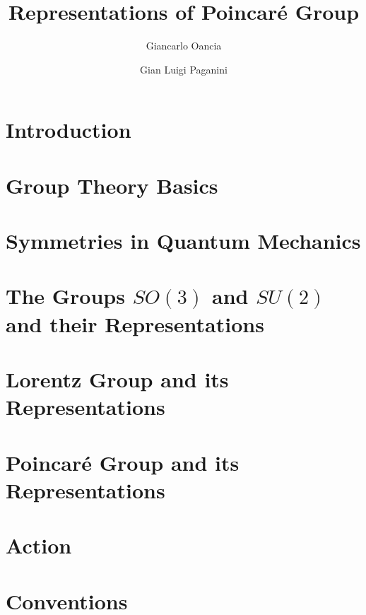 \documentclass[a4paper,11pt]{report}
\title{Representations of Poincaré Group}
\author[a]{Giancarlo Oancia}
\author[a]{Gian Luigi Paganini}
\affiliation[a]{University of Bologna}
\begin{document}
\maketitle
\flushbottom
{}

\chapter{Introduction}


\chapter{Group Theory Basics}


\chapter{Symmetries in Quantum Mechanics}\label{sec:symmetries-qm}


\chapter{The Groups \texorpdfstring{$SO(3)$}{SO(3)} and \texorpdfstring{$SU(2)$}{SU(2)} and their Representations}


\chapter{Lorentz Group and its Representations}


\chapter{Poincaré Group and its Representations}


\chapter{Action}



%
%


\appendix
\chapter{Conventions}


\end{document}
